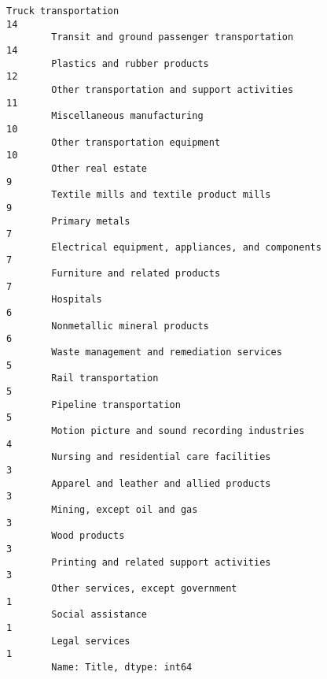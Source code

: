 \documentclass[11pt]{article}
\begin{document}
\begin{Verbatim}[commandchars=\\\{\}]
        Truck transportation                                                     14
        Transit and ground passenger transportation                              14
        Plastics and rubber products                                             12
        Other transportation and support activities                              11
        Miscellaneous manufacturing                                              10
        Other transportation equipment                                           10
        Other real estate                                                         9
        Textile mills and textile product mills                                   9
        Primary metals                                                            7
        Electrical equipment, appliances, and components                          7
        Furniture and related products                                            7
        Hospitals                                                                 6
        Nonmetallic mineral products                                              6
        Waste management and remediation services                                 5
        Rail transportation                                                       5
        Pipeline transportation                                                   5
        Motion picture and sound recording industries                             4
        Nursing and residential care facilities                                   3
        Apparel and leather and allied products                                   3
        Mining, except oil and gas                                                3
        Wood products                                                             3
        Printing and related support activities                                   3
        Other services, except government                                         1
        Social assistance                                                         1
        Legal services                                                            1
        Name: Title, dtype: int64
\end{Verbatim}
            
\end{document}
